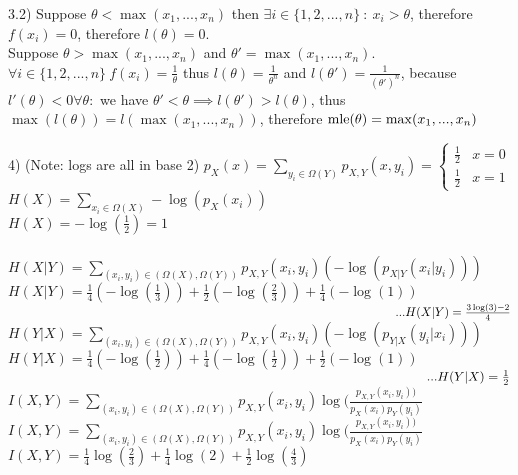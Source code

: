 \documentclass[12pt]{article}
\newcommand{\mle}{\textnormal{mle}}
\newenvironment{problem}[2][Problem]{\begin{trivlist}
\item[\hskip \labelsep {\bfseries #1}\hskip \labelsep {\bfseries #2.}]}{\end{trivlist}}
\begin{document}
\begin{problem}\label{3.2)}
Suppose $\theta < \max(x_1, ..., x_n)$ then $\exists i \in \{1, 2, ..., n\}\ :\ x_i > \theta$, therefore $f(x_i) = 0$, therefore $l(\theta) = 0$.\\
Suppose $\theta > \max(x_1, ..., x_n)$ and $\theta' = \max(x_1, ..., x_n)$. $\forall i \in \{1, 2, ..., n\}\ f(x_i)=\frac{1}{\theta}$ thus $l(\theta) = \frac{1}{\theta^n}$ and $l(\theta') = \frac{1}{(\theta')^n}$, because $l'(\theta) < 0 \forall \theta:$ we have $\theta' < \theta \implies l(\theta') > l(\theta)$, thus $\max(l(\theta)) = l(\max(x_1, ..., x_n))$, therefore $\mle(\theta) = \max(x_1, ..., x_n)$
\end{problem}
\pagebreak
\begin{problem}\label{4)}
(Note: logs are all in base 2)
$p_X(x) = \sum\limits_{y_i \in \Omega(Y)}p_{X,Y}(x,y_i) = \begin{cases} \frac{1}{2} & x = 0\\ \frac{1}{2} & x = 1 \end{cases}$\\
$H(X) = \sum\limits_{x_i \in \Omega(X)}-\log(p_X(x_i))$\\
$H(X) = -\log(\frac{1}{2}) = 1$\\
\\
$H(X\vert Y) = \sum\limits_{(x_i,y_i) \in (\Omega(X), \Omega(Y))}p_{X, Y}(x_i, y_i)(-\log(p_{X\vert Y}(x_i \vert y_i)))$\\
$H(X\vert Y) = \frac{1}{4}(-\log(\frac{1}{3})) + \frac{1}{2}(-\log(\frac{2}{3})) + \frac{1}{4}(-\log(1))$\\
$\hspace*{325pt}...H(X\vert Y) = \frac{3\log(3)-2}{4}$\\
$H(Y\vert X) = \sum\limits_{(x_i,y_i) \in (\Omega(X), \Omega(Y))}p_{X, Y}(x_i, y_i)(-\log(p_{Y\vert X}(y_i \vert x_i)))$\\
$H(Y\vert X) = \frac{1}{4}(-\log(\frac{1}{2})) + \frac{1}{4}(-\log(\frac{1}{2})) + \frac{1}{2}(-\log(1))$\\
$\hspace*{325pt}...H(Y\vert X) = \frac{1}{2}$\\
$I(X, Y) = \sum\limits_{(x_i,y_i) \in (\Omega(X), \Omega(Y))}p_{X, Y}(x_i, y_i)\log(\frac{p_{X,Y}(x_i, y_i))}{p_X(x_i)p_Y(y_i)}$\\
$I(X, Y) = \sum\limits_{(x_i,y_i) \in (\Omega(X), \Omega(Y))}p_{X, Y}(x_i, y_i)\log(\frac{p_{X,Y}(x_i, y_i))}{p_X(x_i)p_Y(y_i)}$\\
$I(X, Y) = \frac{1}{4}\log(\frac{2}{3}) + \frac{1}{4}\log(2) + \frac{1}{2}\log(\frac{4}{3})$\\

\end{problem}
\end{document}
